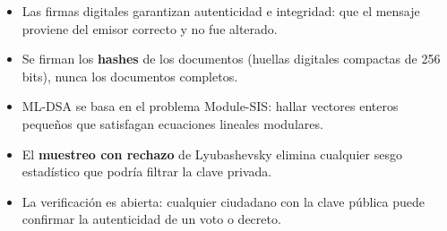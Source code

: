 \begin{resumencapitulo}
\begin{itemize}
  \item Las firmas digitales garantizan autenticidad e integridad: que el mensaje proviene del emisor correcto y no fue alterado.
  \item Se firman los \textbf{hashes} de los documentos (huellas digitales compactas de 256 bits), nunca los documentos completos.
  \item ML-DSA se basa en el problema Module-SIS: hallar vectores enteros pequeños que satisfagan ecuaciones lineales modulares.
  \item El \textbf{muestreo con rechazo} de Lyubashevsky elimina cualquier sesgo estadístico que podría filtrar la clave privada.
  \item La verificación es abierta: cualquier ciudadano con la clave pública puede confirmar la autenticidad de un voto o decreto.
\end{itemize}
\end{resumencapitulo}
